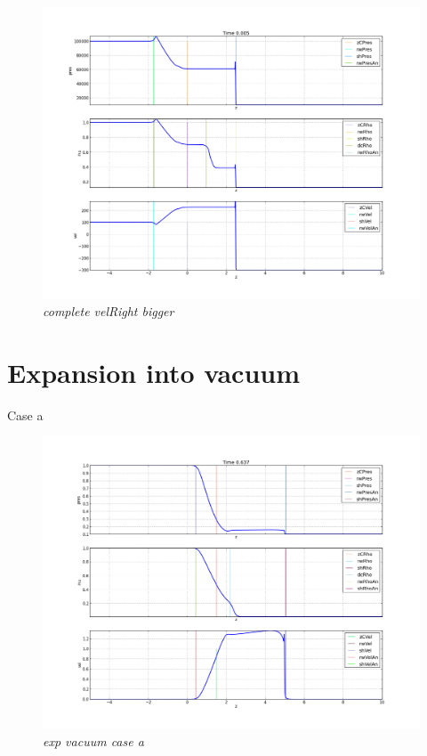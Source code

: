 \documentclass[12pt]{book}
\begin{document}
\begin{figure}[!h]
 \centering
 \includegraphics[scale=0.4]{complete300.png}
	\caption{\emph{complete velRight bigger}}
 \label{Fig: 1}
\end{figure}


\section*{Expansion into vacuum}

Case a
\begin{figure}[!h]
 \centering
 \includegraphics[scale=0.4]{exp_vacuum_a.png}
	\caption{\emph{exp vacuum case a}}
 \label{Fig: 1}
\end{figure}
\end{document}
